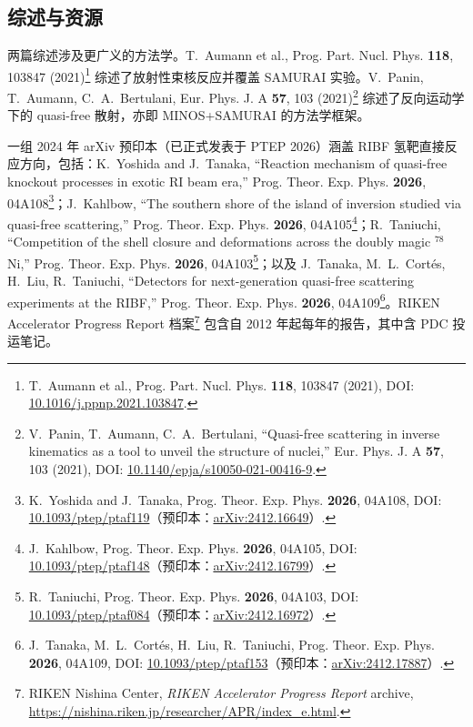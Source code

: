 \documentclass[a4paper, 11pt]{article}
\begin{document}
\subsection{综述与资源}
两篇综述涉及更广义的方法学。T.~Aumann et al., Prog. Part. Nucl. Phys. \textbf{118}, 103847 (2021)\footnote{\label{fn:aumann2021}T.~Aumann et al., Prog. Part. Nucl. Phys. \textbf{118}, 103847 (2021), DOI: \href{https://doi.org/10.1016/j.ppnp.2021.103847}{10.1016/j.ppnp.2021.103847}.} 综述了放射性束核反应并覆盖 SAMURAI 实验。V.~Panin, T.~Aumann, C.~A.~Bertulani, Eur. Phys. J. A \textbf{57}, 103 (2021)\footnote{\label{fn:panin2021}V.~Panin, T.~Aumann, C.~A.~Bertulani, ``Quasi-free scattering in inverse kinematics as a tool to unveil the structure of nuclei,'' Eur. Phys. J. A \textbf{57}, 103 (2021), DOI: \href{https://doi.org/10.1140/epja/s10050-021-00416-9}{10.1140/epja/s10050-021-00416-9}.} 综述了反向运动学下的 quasi-free 散射，亦即 MINOS+SAMURAI 的方法学框架。

一组 2024 年 arXiv 预印本（已正式发表于 PTEP 2026）涵盖 RIBF 氢靶直接反应方向，包括：K.~Yoshida and J.~Tanaka, ``Reaction mechanism of quasi-free knockout processes in exotic RI beam era,'' Prog. Theor. Exp. Phys. \textbf{2026}, 04A108\footnote{\label{fn:yoshida2024}K.~Yoshida and J.~Tanaka, Prog. Theor. Exp. Phys. \textbf{2026}, 04A108, DOI: \href{https://doi.org/10.1093/ptep/ptaf119}{10.1093/ptep/ptaf119}（预印本：\href{https://arxiv.org/abs/2412.16649}{arXiv:2412.16649}）.}；J.~Kahlbow, ``The southern shore of the island of inversion studied via quasi-free scattering,'' Prog. Theor. Exp. Phys. \textbf{2026}, 04A105\footnote{\label{fn:kahlbow2024arxiv}J.~Kahlbow, Prog. Theor. Exp. Phys. \textbf{2026}, 04A105, DOI: \href{https://doi.org/10.1093/ptep/ptaf148}{10.1093/ptep/ptaf148}（预印本：\href{https://arxiv.org/abs/2412.16799}{arXiv:2412.16799}）.}；R.~Taniuchi, ``Competition of the shell closure and deformations across the doubly magic $^{78}$Ni,'' Prog. Theor. Exp. Phys. \textbf{2026}, 04A103\footnote{\label{fn:taniuchi2024}R.~Taniuchi, Prog. Theor. Exp. Phys. \textbf{2026}, 04A103, DOI: \href{https://doi.org/10.1093/ptep/ptaf084}{10.1093/ptep/ptaf084}（预印本：\href{https://arxiv.org/abs/2412.16972}{arXiv:2412.16972}）.}；以及 J.~Tanaka, M.~L.~Cortés, H.~Liu, R.~Taniuchi, ``Detectors for next-generation quasi-free scattering experiments at the RIBF,'' Prog. Theor. Exp. Phys. \textbf{2026}, 04A109\footnote{\label{fn:tanaka2024}J.~Tanaka, M.~L.~Cortés, H.~Liu, R.~Taniuchi, Prog. Theor. Exp. Phys. \textbf{2026}, 04A109, DOI: \href{https://doi.org/10.1093/ptep/ptaf153}{10.1093/ptep/ptaf153}（预印本：\href{https://arxiv.org/abs/2412.17887}{arXiv:2412.17887}）.}。RIKEN Accelerator Progress Report 档案\footnote{\label{fn:rikenapr}RIKEN Nishina Center, \emph{RIKEN Accelerator Progress Report} archive, \url{https://nishina.riken.jp/researcher/APR/index_e.html}.} 包含自 2012 年起每年的报告，其中含 PDC 投运笔记。
\end{document}
